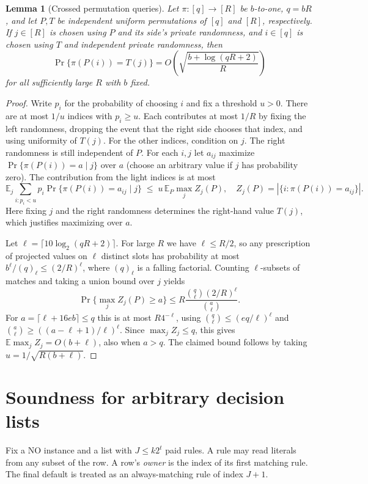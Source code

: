 \documentclass[11pt]{article}
\newtheorem{lemma}[theorem]{Lemma}
\newcommand{\E}{\mathbb{E}}
\begin{document}
\begin{lemma}[Crossed permutation queries]\label{lem:crossed}
Let $\pi:[q]\to[R]$ be $b$-to-one, $q=bR$, and let $P,T$
be independent uniform permutations of $[q]$ and $[R]$,
respectively. If $j\in[R]$ is chosen using $P$ and its side's
private randomness, and $i\in[q]$ is chosen using $T$ and
independent private randomness, then
\[
  \Pr\{\pi(P(i))=T(j)\}
  = O\!\left(\sqrt{\frac{b+\log(qR+2)}{R}}\right)
\]
for all sufficiently large $R$ with $b$ fixed.
\end{lemma}
\begin{proof}
Write $p_i$ for the probability of choosing $i$ and fix a threshold
$u>0$. There are at most $1/u$ indices with $p_i\ge u$. Each contributes
at most $1/R$ by fixing the left randomness, dropping the event
that the right side chooses that index, and using uniformity of $T(j)$.
For the other indices, condition on $j$. The right randomness is
still independent of $P$. For each $i,j$ let $a_{ij}$ maximize
$\Pr\{\pi(P(i))=a\mid j\}$ over $a$ (choose an arbitrary value if
$j$ has probability zero). The contribution from the light indices
is at most
\[
  \E_j\sum_{i:p_i<u}p_i\Pr\{\pi(P(i))=a_{ij}\mid j\}
  \;\le\;u\,\E_P\max_j Z_j(P),
\quad Z_j(P)=|\{i:\pi(P(i))=a_{ij}\}|.
\]
Here fixing $j$ and the right randomness determines the right-hand
value $T(j)$, which justifies maximizing over $a$.

Let $\ell=\lceil10\log_2(qR+2)\rceil$. For large $R$ we have
$\ell\le R/2$, so any prescription of projected values on $\ell$
distinct slots has probability at most $b^\ell/(q)_\ell\le(2/R)^\ell$,
where $(q)_\ell$ is a falling factorial. Counting $\ell$-subsets of
matches and taking a union bound over $j$ yields
\[
   \Pr\{\max_j Z_j(P)\ge a\}
   \le R\frac{\binom{q}{\ell}(2/R)^\ell}{\binom{a}{\ell}} .
\]
For $a=\lceil\ell+16eb\rceil\le q$ this is at most $R4^{-\ell}$, using
$\binom{q}{\ell}\le(eq/\ell)^\ell$ and
$\binom{a}{\ell}\ge((a-\ell+1)/\ell)^\ell$.
Since $\max_j Z_j\le q$, this gives $\E\max_j Z_j=O(b+\ell)$,
also when $a>q$. The claimed bound follows by taking
$u=1/\sqrt{R(b+\ell)}$.
\end{proof}

\section{Soundness for arbitrary decision lists}\label{sec:soundness}

Fix a NO instance and a list with $J\le k2^t$ paid rules. A rule may
read literals from any subset of the row. A row's \emph{owner} is the
index of its first matching rule. The final default is
treated as an always-matching rule of index $J+1$.
\end{document}
